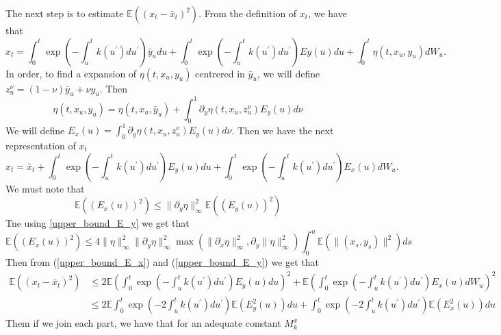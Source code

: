 \documentclass[a4paper,10pt]{article}
\newcommand{\1}{\mathbf{1}}
\begin{document}
The next step is to estimate $\mathbb{E}((x_t - \bar{x}_t)^{2})$. From the definition of $x_t$, we have that
\begin{equation*}
x_t = \int_{0}^{t} \exp\left(- \int_{u}^{t} k(u^{\prime}) du^{\prime}\right) \bar{y}_u du + \int_{0}^{t} \exp\left(- \int_{u}^{t} k(u^{\prime}) du^{\prime}\right) E{y}(u) du + \int_{0}^{t} \eta(t,x_u,y_u) dW_u. 
\end{equation*}
In order, to find a expansion of $\eta(t,x_u,y_u)$ centrered in $\bar{y}_u$, we will define $z^{\nu}_{u} = (1-\nu)\bar{y}_{u} + \nu y_u$. Then
\begin{equation*}
\eta(t,x_u,y_u) = \eta(t,x_u,\bar{y}_u) + \int_{0}^{1}\partial_y\eta(t,x_u,z^{\nu}_{u}) E_{y}(u) d\nu
\end{equation*}
We will define $E_{x}(u) = \int_{0}^{1}\partial_y\eta(t,x_u,z^{\nu}_{u}) E_{y}(u) d\nu$. Then we have the next representation of $x_t$
\begin{equation*}
x_t = \bar{x}_t + \int_{0}^{t} \exp\left(- \int_{u}^{t} k(u^{\prime}) du^{\prime}\right) E_{y}(u) du + \int_{0}^{t} \exp\left(- \int_{u}^{t} k(u^{\prime}) du^{\prime}\right) E_{x}(u) dW_u.
\end{equation*}
We must note that
\begin{equation*}
 \mathbb{E}((E_x(u))^{2}) \leq \|\partial_y \eta \|^{2}_{\infty} \mathbb{E}((E_{y}(u))^{2})   
\end{equation*}
Tne using \ref{upper_bound_E_y} we get that
\begin{equation}\label{upper_bound_E_x}
 \mathbb{E}((E_x(u))^{2}) \leq 4 \|\eta\|^{2}_{\infty} \|\partial_y \eta\|^{2}_{\infty} \max(\|\partial_x\eta\|^{2}_{\infty},\partial_y\|\eta\|^{2}_{\infty} ) \int_{0}^{u} \mathbb{E}\left( \|(x_s, y_s)\|^{2}\right) ds
\end{equation}
Then from (\ref{upper_bound_E_x}) and (\ref{upper_bound_E_y}) we get that 
\begin{align*}
\mathbb{E}((x_t - \bar{x}_t)^{2}) & \leq 2 \mathbb{E}\left( \int_{0}^{t} \exp\left(- \int_{u}^{t} k(u^{\prime}) du^{\prime}\right) E_{y}(u) du    \right)^2 + \mathbb{E}\left( \int_{0}^{t} \exp\left(- \int_{u}^{t} k(u^{\prime}) du^{\prime}\right) E_{x}(u) dW_u\right)^{2} \\
&\leq 2 \mathbb{E}\int_{0}^{t} \exp\left(- 2\int_{u}^{t} k(u^{\prime}) du^{\prime}\right) \mathbb{E}(E^{2}_{y}(u)) du + \int_{0}^{t} \exp\left(- 2\int_{u}^{t} k(u^{\prime}) du^{\prime}\right) \mathbb{E}(E^{2}_{x}(u)) du   
\end{align*}
Them if we join each part, we have that for an adequate constant $M^{x}_k$ 
\end{document}
